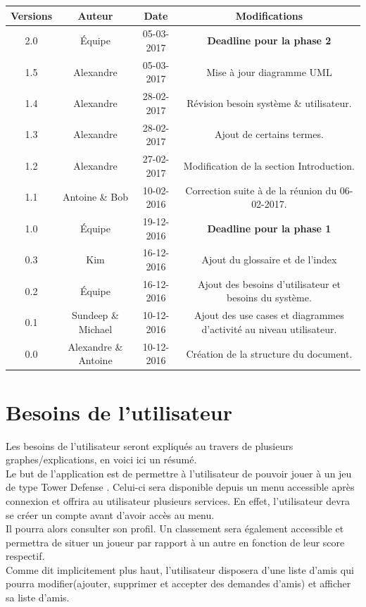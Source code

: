 \documentclass[10pt,a4paper]{article}
\begin{document}
\begin{center}
\hspace*{0cm}
\begin{tabular}{|c|c|c|c|}
\hline
Versions & Auteur & Date & Modifications \\
\hline
2.0 & Équipe & 05-03-2017 &\textbf{Deadline pour la phase 2}\\
1.5 & Alexandre & 05-03-2017 & Mise à jour diagramme UML\\
1.4 & Alexandre & 28-02-2017 & Révision besoin système \& utilisateur.\\
1.3 & Alexandre & 28-02-2017 & Ajout de certains termes.\\
1.2 & Alexandre & 27-02-2017 & Modification de la section Introduction.\\
1.1 & Antoine \& Bob & 10-02-2016 & Correction suite à de la réunion du 06-02-2017. \\
1.0 & Équipe & 19-12-2016 & \textbf{Deadline pour la phase 1}\\
0.3 & Kim & 16-12-2016 & Ajout du glossaire et de l'index\\
0.2 & Équipe & 16-12-2016 & Ajout des besoins d'utilisateur et besoins du système.\\
0.1 & Sundeep \& Michael & 10-12-2016 & Ajout des use cases et diagrammes d'activité au niveau utilisateur.\\
0.0 & Alexandre \& Antoine & 10-12-2016 & Création de la structure du document.\\
\hline
\end{tabular}
\end{center}


\newpage
\section{Besoins de l'utilisateur}

 Les besoins de l'\gls{utilisateur} seront expliqués au travers de plusieurs graphes/explications, en voici ici un résumé.\\
Le but de l'application est de permettre à l'\gls{utilisateur} de pouvoir jouer à un jeu de type \gls{Tower Defense} . Celui-ci sera disponible depuis un menu accessible après connexion et offrira au \gls{utilisateur} plusieurs services. En effet, l'\gls{utilisateur} devra se créer un \gls{compte} avant d'avoir accès au menu.\\
Il pourra alors consulter son profil.
Un classement sera également accessible et permettra de situer un \gls{joueur} par rapport à un autre en fonction de leur score respectif.\\
Comme dit implicitement plus haut, l'\gls{utilisateur} disposera d'une liste d'amis qui pourra modifier(ajouter, supprimer et accepter des demandes d'amis) et afficher sa liste d'amis.\\
\end{document}
